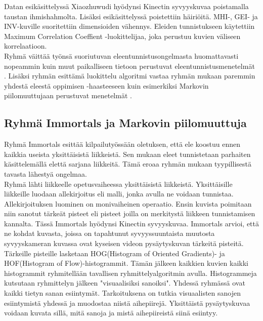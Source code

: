 Datan esikäsittelyssä Xiaozhuwudi hyödynsi Kinectin syvyyskuvaa poistamalla taustan ihmishahmolta. Lisäksi esikäsittelyssä poistettiin häiriöitä.
MHI-, GEI- ja INV-kuville suoritettiin dimensioiden vähennys. Eleiden tunnistukseen käytettiin Maximum Correlation Coeffient -luokittelijaa,
joka perustuu kuvien väliseen korrelaatioon. \citep{6239179}\\

Ryhmä väittää työnsä suoriutuvan eleentunnistusongelmasta huomattavasti nopeammin kuin muut paikalliseen tietoon perustuvat eleentunnistusmenetelmät \citep{firstround}.
Lisäksi ryhmän esittämä luokittelu algoritmi vastaa ryhmän mukaan paremmin yhdestä eleestä oppimisen -haasteeseen kuin esimerkiksi Markovin piilomuuttujaan perustuvat menetelmät
\citep{6239179}.

\subsection{Ryhmä Immortals ja Markovin piilomuuttuja}

Ryhmä Immortals esittää kilpailutyössään oletuksen, että ele koostuu ennen kaikkia useista yksittäisistä liikkeistä. 
Sen mukaan eleet tunnistetaan parhaiten käsittelemällä elettä sarjana liikkeitä. Tämä eroaa ryhmän mukaan tyypillisestä 
tavasta lähestyä ongelmaa.\citep {6239185}\\

Ryhmä lähti liikkeelle opetusvaiheessa yksittäisistä liikkeistä. Yksittäisille liikkeille luodaan allekirjoitus eli malli,
jonka avulla ne voidaan tunnistaa. Allekirjoituksen luominen on monivaiheinen operaatio. Ensin kuvista poimitaan niin sanotut
tärkeät pisteet eli pisteet joilla on merkitystä liikkeen tunnistamisen kannalta. Tässä Immortals hyödynsi Kinectin syvyyskuvaa.
Immortals arvioi, että ne kohdat kuvasta, joissa on tapahtunut syvyyssuuntaista muutosta syvyyskameran kuvassa ovat kyseisen videon pysäytyskuvan
tärkeitä pisteitä. Tärkeille pisteille lasketaan HOG(Histogram of Oriented Gradients)- ja HOF(Histogram of Flow)-histogrammit. 
Tämän jälkeen kaikkien kuvien kaikki histogrammit ryhmitellään tavallisen ryhmittelyalgoritmin avulla.
Histogrammeja kutsutaan ryhmittelyn jälkeen "visuaalisiksi sanoiksi". Yhdessä ryhmässä ovat kaikki tietyn sanan esiintymät.
Tarkoituksena on tutkia visuaalisten sanojen esiintymistä yhdessä ja muodostaa niistä aihepiirejä. 
Yksittäistä pysäytyskuvaa voidaan kuvata sillä, mitä sanoja ja mistä aihepiireistä siinä esiintyy.\citep {6239185}\\

